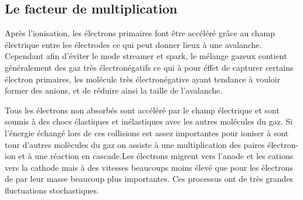 \subsection{Le facteur de multiplication}
Après l'ionisation, les électrons primaires font être accéléré grâce au champ électrique entre les électrodes ce qui peut donner lieux à une avalanche. Cependant afin d'éviter le mode streamer et spark, le mélange gazeux contient généralement des gaz très électronégatifs ce qui à pour éffet de capturer certains électron primaires, les molécule très électronégative ayant tendance à vouloir former des anions, et de réduire ainsi la taille de l'avalanche. 

Tous les électrons non absorbés sont accéléré par le champ électrique et sont soumis à des chocs élastiques et inélastiques avec les autres molécules du gaz. Si l'énergie échangé lors de ces collisions est assez importantes pour ioniser à sont tour d'autres molècules du gaz on assiste à une multiplication des paires électron-ion et à une réaction en cascade.Les électrons migrent vers l'anode et les cations vers la cathode mais à des vitesses beaucoups moins élevé que pour les électrons de par leur masse beaucoup plus importantes. Ces processus ont de très grandes fluctuations stochastiques.

